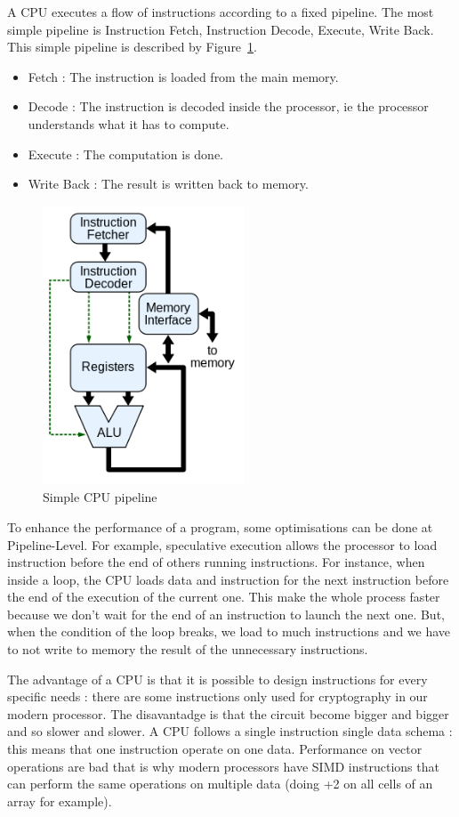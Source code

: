 A \ac{CPU} executes a flow of instructions according to a fixed pipeline. The most simple pipeline is Instruction Fetch, Instruction Decode, Execute, Write Back. This simple pipeline is described by Figure~\ref{fig:Pipeline}.
\begin{itemize}
\item Fetch : The instruction is loaded from the main memory.
\item Decode : The instruction is decoded inside the processor, ie the processor understands what it has to compute.
\item Execute : The computation is done.
\item Write Back : The result is written back to memory.
\end{itemize}

\begin{figure}
\centering
\includegraphics[width=6cm]{gfx/Parallelism/Pipeline.png}
\caption{Simple \ac{CPU} pipeline}
\label{fig:Pipeline}
\end{figure}

To enhance the performance of a program, some optimisations can be done at Pipeline-Level. For example, speculative execution allows the processor to load instruction before the end of others running instructions. For instance, when inside a loop, the \ac{CPU} loads data and instruction for the next instruction before the end of the execution of the current one. This make the whole process faster because we don't wait for the end of an instruction to launch the next one. But, when the condition of the loop breaks, we load to much instructions and we have to not write to memory the result of the unnecessary instructions.

The advantage of a \ac{CPU} is that it is possible to design instructions for every specific needs : there are some instructions only used for cryptography in our modern processor. The disavantadge is that the circuit become bigger and bigger and so slower and slower. A \ac{CPU} follows a single instruction single data  schema : this means that one instruction operate on one data. Performance on vector operations are bad that is why modern processors have \ac{SIMD} instructions that can perform the same operations on multiple data (doing +2 on all cells of an array for example).

